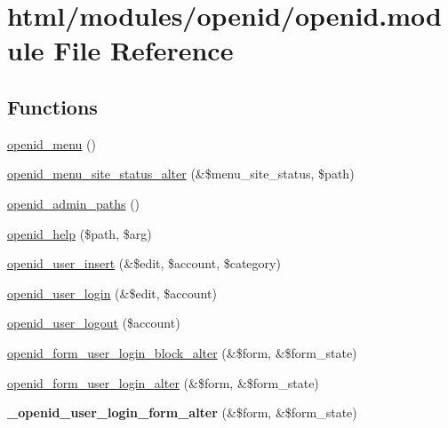 \hypertarget{openid_8module}{
\section{html/modules/openid/openid.module File Reference}
\label{openid_8module}
}
\subsection*{Functions}
\begin{DoxyCompactItemize}
\item 
\hyperlink{openid_8module_aa69d0d365b41e46075ea773c996138d7}{openid\_\-menu} ()
\item 
\hyperlink{openid_8module_aff513e1dfb782931acb6ba216acf47d6}{openid\_\-menu\_\-site\_\-status\_\-alter} (\&\$menu\_\-site\_\-status, \$path)
\item 
\hyperlink{openid_8module_aac1965c6df11df447cef2984b059de23}{openid\_\-admin\_\-paths} ()
\item 
\hyperlink{openid_8module_ab1f39ca3181eb680cf6ed2600f879299}{openid\_\-help} (\$path, \$arg)
\item 
\hyperlink{openid_8module_a11174384d46cea926dbe85c0fc64dcce}{openid\_\-user\_\-insert} (\&\$edit, \$account, \$category)
\item 
\hyperlink{openid_8module_aa0ecaf6826cbc73940e3e88ef18a2715}{openid\_\-user\_\-login} (\&\$edit, \$account)
\item 
\hyperlink{openid_8module_a46b5934f9e70d9f51afb48d413db6ffe}{openid\_\-user\_\-logout} (\$account)
\item 
\hyperlink{openid_8module_a9820da9d7dabe2b3ef2e3e47af3d7a35}{openid\_\-form\_\-user\_\-login\_\-block\_\-alter} (\&\$form, \&\$form\_\-state)
\item 
\hyperlink{openid_8module_a0814fd0ed315219d49d117462946c6c3}{openid\_\-form\_\-user\_\-login\_\-alter} (\&\$form, \&\$form\_\-state)
\item 
\hypertarget{openid_8module_a134a571d0b1f54e9feed91d2aacd7d1d}{
{\bfseries \_\-openid\_\-user\_\-login\_\-form\_\-alter} (\&\$form, \&\$form\_\-state)}
\label{openid_8module_a134a571d0b1f54e9feed91d2aacd7d1d}


\end{DoxyCompactItemize}
